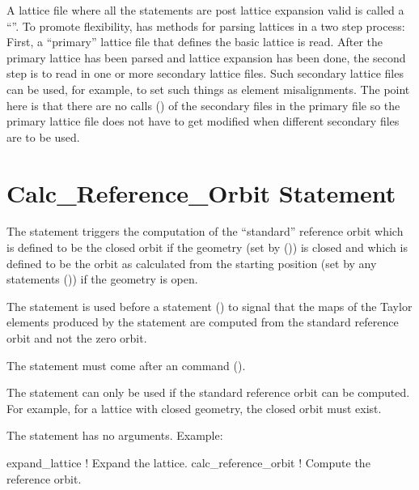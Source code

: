 {{{{{
A lattice file where all the statements are post lattice expansion valid is called a ``''.  To promote flexibility, \bmad has methods for parsing lattices in a two step
process: First, a ``primary'' lattice file that defines the basic lattice is read. After the primary
lattice has been parsed and lattice expansion has been done, the second step is to read in one or
more secondary lattice files. Such secondary lattice files can be used, for example, to set such
things as element misalignments. The point here is that there are no calls () of the
secondary files in the primary file so the primary lattice file does not have to get modified when
different secondary files are to be used.

\section{Calc_Reference_Orbit Statement}
\label{s:calc.ref.orbit}

The  statement triggers the computation of the ``standard'' reference orbit
which is defined to be the closed orbit if the geometry (set by 
()) is closed and which is defined to be the orbit as calculated from the starting
position (set by any  statements ()) if the geometry is open.

The  statement is used before a  statement
() to signal that the maps of the Taylor elements produced by the
 statement are computed from the standard reference orbit and not the zero
orbit.

The  statement must come after an  command
().

The  statement can only be used if the standard reference orbit can
be computed. For example, for a lattice with closed geometry, the closed orbit must exist.

The  statement has no arguments. Example:
\begin{example}
  expand_lattice          ! Expand the lattice.
  calc_reference_orbit    ! Compute the reference orbit.
\end{example}

}}}}}
